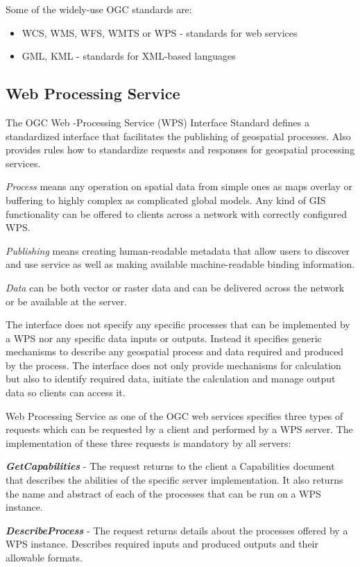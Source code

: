 Some of the widely-use OGC standards are:
\begin{itemize}
\item WCS, WMS, WFS, WMTS or WPS - standards for web services
\item GML, KML - standards for XML-based languages
\end{itemize}


\bigskip
\subsection{Web Processing Service}
The OGC Web -Processing Service (WPS) Interface Standard defines a standardized interface
that facilitates the publishing of geospatial processes. Also provides rules how to standardize
requests and responses for geospatial processing services. 

\textit{Process} means any operation on spatial
data from simple ones as maps overlay or buffering to highly complex as complicated global models. Any kind of GIS 
functionality can be offered to clients across a network with correctly configured WPS. 

\textit{Publishing} means
creating human-readable metadata that allow users to discover and use service as well as making 
available machine-readable binding information.

\textit{Data} can be both vector or raster data and can be delivered across the network or be available
at the server.

The interface does not specify any specific processes that can be implemented by a WPS nor any specific
data inputs or outputs. Instead it specifies generic mechanisms to describe any geospatial process and
data required and produced by the process. The interface does not only provide mechanisms for calculation
but also to identify required data, initiate the calculation and manage output data so clients can access it. 

\bigskip
Web Processing Service as one of the OGC web services specifies three types of requests which can be requested
by a client and performed by a WPS server. The implementation of these three requests is mandatory by all servers:

\textbf{\textit{GetCapabilities}} - The request returns to the client a Capabilities document that describes the abilities
of the specific server implementation. It also returns the name and abstract of each of the processes that can
be run on a WPS instance.

\textbf{\textit{DescribeProcess}} - The request returns details about the processes offered by a WPS instance. Describes
required inputs and produced outputs and their allowable formats.

